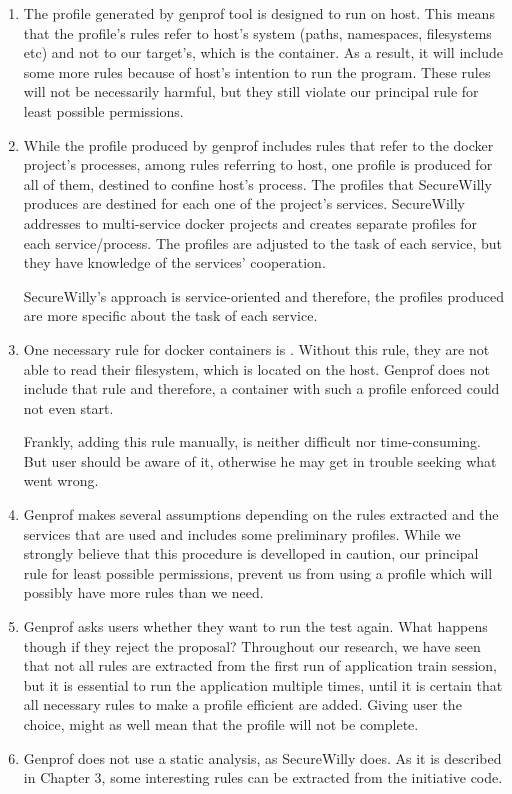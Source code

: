 \begin{enumerate}
\item The profile generated by genprof tool is designed to run on host. This means that the profile's rules refer to host's system (paths, namespaces, filesystems etc) and not to our target's, which is the container.
As a result, it will include some more rules because of host's intention to run the program. These rules will not be necessarily harmful, but they still violate our principal rule for least possible permissions.

\item While the profile produced by genprof includes rules that refer to the docker project's processes, among rules referring to host, one profile is produced for all of them, destined to confine host's process. The profiles that SecureWilly produces are destined for each one of the project's services. SecureWilly addresses to multi-service docker projects and creates separate profiles for each service/process. The profiles are adjusted to the task of each service, but they have knowledge of the services' cooperation.

SecureWilly's approach is service-oriented and therefore, the profiles produced are more specific about the task of each service. 

\item One necessary rule for docker containers is . Without this rule, they are not able to read their filesystem, which is located on the host. Genprof does not include that rule and therefore, a container with such a profile enforced could not even start.

Frankly, adding this rule manually, is neither difficult nor time-consuming. But user should be aware of it, otherwise he may get in trouble seeking what went wrong.

\item Genprof makes several assumptions depending on the rules extracted and the services that are used and includes some preliminary profiles. While we strongly believe that this procedure is develloped in caution, our principal rule for least possible permissions, prevent us from using a profile which will possibly have more rules than we need.

\item Genprof asks users whether they want to run the test again. What happens though if they reject the proposal? Throughout our research, we have seen that not all rules are extracted from the first run of application train session, but it is essential to run the application multiple times, until it is certain that all necessary rules to make a profile efficient are added. Giving user the choice, might as well mean that the profile will not be complete.

\item Genprof does not use a static analysis, as SecureWilly does. As it is described in Chapter 3, some interesting rules can be extracted from the initiative code.
\end{enumerate}
